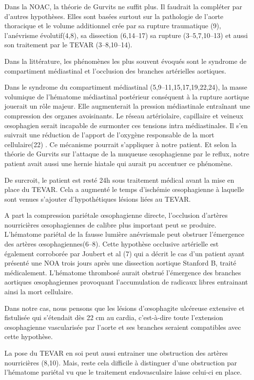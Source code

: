 \documentclass[./tfe.tex]{subfiles}
\begin{document}
Dans la NOAC, la théorie de Gurvits ne suffit plus. Il faudrait la compléter par d’autres hypothèses. Elles sont basées surtout sur la pathologie de l’aorte thoracique et le volume additionnel crée par sa rupture traumatique (9), l’anévrisme évolutif(4,8), sa dissection (6,14–17) sa rupture (3–5,7,10–13) et aussi son traitement par le TEVAR (3–8,10–14).

Dans la littérature, les phénomènes les plus souvent évoqués sont le syndrome de compartiment médiastinal et l’occlusion des branches artérielles aortiques.

Dans le syndrome du compartiment médiastinal (5,9–11,15,17,19,22,24), la masse volumique de l'hématome médiastinal postérieur conséquent à la rupture aortique jouerait un rôle majeur. Elle augmenterait la pression médiastinale entraînant une compression des organes avoisinants. Le réseau artériolaire, capillaire et veineux œsophagien serait incapable de surmonter ces tensions intra médiastinales. Il s’en suivrait une réduction de l’apport de l’oxygène responsable de la mort cellulaire(22) . Ce mécanisme pourrait s’appliquer à notre patient. Et selon la théorie de Gurvits sur l’attaque de la muqueuse œsophagienne par le reflux, notre patient avait aussi une hernie hiatale qui aurait pu accentuer ce phénomène.

De surcroit, le patient est resté 24h sous traitement médical avant la mise en place du TEVAR. Cela a augmenté le temps d’ischémie œsophagienne à laquelle sont venues s’ajouter d’hypothétiques lésions liées au TEVAR.

A part la compression pariétale œsophagienne directe, l’occlusion d’artères nourricières œsophagiennes de calibre plus important peut se produire. L’hématome pariétal de la fausse lumière anévrismale peut obstruer l’émergence des artères œsophagiennes(6–8). Cette hypothèse occlusive artérielle est également corroborée par Joubert et al (7) qui a décrit le cas d'un patient ayant présenté une NOA trois jours après une dissection aortique Stanford B, traité médicalement. L'hématome thrombosé aurait obstrué l’émergence des branches aortiques œsophagiennes provoquant l'accumulation de radicaux libres entrainant ainsi la mort cellulaire. 

Dans notre cas, nous pensons que les lésions d’œsophagite ulcéreuse extensive et fistulisée qui s'étendait dès 22 cm au cardia, c'est-à-dire toute l'extension œsophagienne vascularisée par l'aorte et ses branches seraient compatibles avec cette hypothèse.

La pose du TEVAR en soi peut aussi entrainer une obstruction des artères nourricières (8,10). Mais, reste cela difficile à distinguer d’une obstruction par l’hématome pariétal vu que le traitement endovasculaire laisse celui-ci en place.
\end{document}
